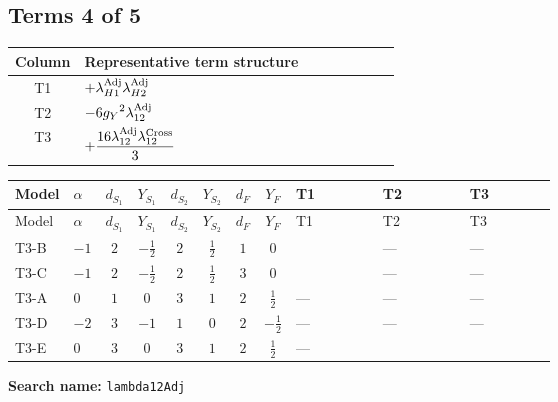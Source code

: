 \documentclass[8pt]{article}
\begin{document}
\begin{landscape}
\subsection*{Terms 4 of 5}
\begin{center}
\begin{tabular}{@{}c >{\raggedright\arraybackslash}p{0.82\linewidth}@{}}
\toprule
Column & Representative term structure \\
\midrule
T1 & \(\displaystyle +{\lambda_{H1}^{\rm Adj}} {\lambda_{H2}^{\rm Adj}}\) \\
\midrule
T2 & \(\displaystyle -6 {g_Y}^2 {\lambda_{12}^{\rm Adj}}\) \\
\midrule
T3 & \(\displaystyle +\frac{16 {\lambda_{12}^{\rm Adj}} {\lambda_{12}^{\rm Cross}}}{3}\) \\
\midrule
\bottomrule
\end{tabular}
\end{center}
\smallskip
\tiny
\begin{longtable}{@{}llcccccc >{\raggedright\arraybackslash}p{0.21\linewidth} >{\raggedright\arraybackslash}p{0.21\linewidth} >{\raggedright\arraybackslash}p{0.21\linewidth}@{}}
\toprule
Model & $\alpha$ & $d_{S_1}$ & $Y_{S_1}$ & $d_{S_2}$ & $Y_{S_2}$ & $d_F$ & $Y_F$ & T1 & T2 & T3 \\
\midrule
\endfirsthead
\toprule
Model & $\alpha$ & $d_{S_1}$ & $Y_{S_1}$ & $d_{S_2}$ & $Y_{S_2}$ & $d_F$ & $Y_F$ & T1 & T2 & T3 \\
\midrule
\endhead
T3-B & $-1$ & $2$ & $-\frac{1}{2}$ & $2$ & $\frac{1}{2}$ & $1$ & $0$ & \scriptsize\adjustbox{max width=\linewidth}{$\begin{gathered} +{\lambda_{H1}^{\rm Adj}} {\lambda_{H2}^{\rm Adj}}\end{gathered}$} & --- & --- \\
\midrule
T3-C & $-1$ & $2$ & $-\frac{1}{2}$ & $2$ & $\frac{1}{2}$ & $3$ & $0$ & \scriptsize\adjustbox{max width=\linewidth}{$\begin{gathered} +{\lambda_{H1}^{\rm Adj}} {\lambda_{H2}^{\rm Adj}}\end{gathered}$} & --- & --- \\
\midrule
T3-A & $0$ & $1$ & $0$ & $3$ & $1$ & $2$ & $\frac{1}{2}$ & --- & --- & --- \\
\midrule
T3-D & $-2$ & $3$ & $-1$ & $1$ & $0$ & $2$ & $-\frac{1}{2}$ & --- & --- & --- \\
\midrule
T3-E & $0$ & $3$ & $0$ & $3$ & $1$ & $2$ & $\frac{1}{2}$ & --- & \scriptsize\adjustbox{max width=\linewidth}{$\begin{gathered} -6 {g_Y}^2 {\lambda_{12}^{\rm Adj}}\end{gathered}$} & \scriptsize\adjustbox{max width=\linewidth}{$\begin{gathered} +\frac{16 {\lambda_{12}^{\rm Adj}} {\lambda_{12}^{\rm Cross}}}{3}\end{gathered}$} \\
\midrule
\bottomrule
\end{longtable}
\clearpage
\noindent\textbf{Search name: }\texttt{lambda12Adj}\par\smallskip

\end{landscape}
\end{document}
